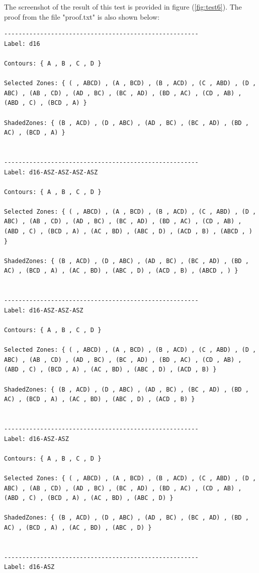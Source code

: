 \documentclass[10pt, a4paper, titlepage]{article}
\begin{document}
The screenshot of the result of this test is provided in figure (\ref{fig:test6}). The proof from the file "proof.txt" is also shown below:

\small
\begin{lstlisting}
------------------------------------------------------
Label: d16

Contours: { A , B , C , D } 

Selected Zones: { ( , ABCD) , (A , BCD) , (B , ACD) , (C , ABD) , (D , ABC) , (AB , CD) , (AD , BC) , (BC , AD) , (BD , AC) , (CD , AB) , (ABD , C) , (BCD , A) }  

ShadedZones: { (B , ACD) , (D , ABC) , (AD , BC) , (BC , AD) , (BD , AC) , (BCD , A) } 


------------------------------------------------------
Label: d16-ASZ-ASZ-ASZ-ASZ

Contours: { A , B , C , D } 

Selected Zones: { ( , ABCD) , (A , BCD) , (B , ACD) , (C , ABD) , (D , ABC) , (AB , CD) , (AD , BC) , (BC , AD) , (BD , AC) , (CD , AB) , (ABD , C) , (BCD , A) , (AC , BD) , (ABC , D) , (ACD , B) , (ABCD , ) }  

ShadedZones: { (B , ACD) , (D , ABC) , (AD , BC) , (BC , AD) , (BD , AC) , (BCD , A) , (AC , BD) , (ABC , D) , (ACD , B) , (ABCD , ) } 


------------------------------------------------------
Label: d16-ASZ-ASZ-ASZ

Contours: { A , B , C , D } 

Selected Zones: { ( , ABCD) , (A , BCD) , (B , ACD) , (C , ABD) , (D , ABC) , (AB , CD) , (AD , BC) , (BC , AD) , (BD , AC) , (CD , AB) , (ABD , C) , (BCD , A) , (AC , BD) , (ABC , D) , (ACD , B) }  

ShadedZones: { (B , ACD) , (D , ABC) , (AD , BC) , (BC , AD) , (BD , AC) , (BCD , A) , (AC , BD) , (ABC , D) , (ACD , B) } 


------------------------------------------------------
Label: d16-ASZ-ASZ

Contours: { A , B , C , D } 

Selected Zones: { ( , ABCD) , (A , BCD) , (B , ACD) , (C , ABD) , (D , ABC) , (AB , CD) , (AD , BC) , (BC , AD) , (BD , AC) , (CD , AB) , (ABD , C) , (BCD , A) , (AC , BD) , (ABC , D) }  

ShadedZones: { (B , ACD) , (D , ABC) , (AD , BC) , (BC , AD) , (BD , AC) , (BCD , A) , (AC , BD) , (ABC , D) } 


------------------------------------------------------
Label: d16-ASZ


\end{lstlisting}
\end{document}
